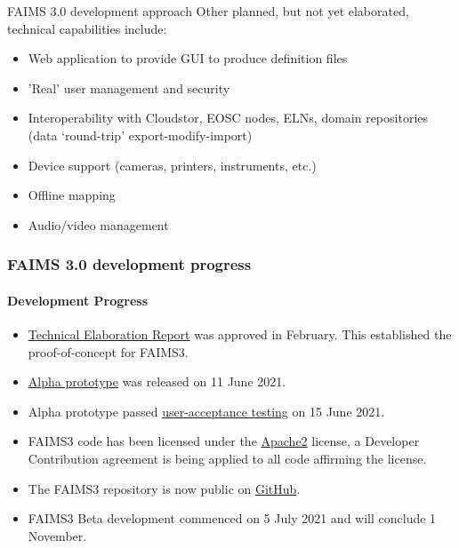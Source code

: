 \documentclass[aspectratio=169, 12pt]{beamer} %
\begin{document}
\begin{frame}{FAIMS 3.0 development approach}
Other planned, but not yet elaborated, technical capabilities include:
    \begin{itemize}[label=\textbullet]
        \item Web application to provide GUI to produce definition files
        \item 'Real' user management and security
        \item Interoperability with Cloudstor, EOSC nodes, ELNs, domain repositories (data `round-trip' export-modify-import)
        \item Device support (cameras, printers, instruments, etc.)
        \item Offline mapping
        \item Audio/video management
    \end{itemize}
\end{frame}

\begin{frame}
    \frametitle{FAIMS 3.0 development progress}
    \framesubtitle{Development Progress}        
        \begin{itemize}[label=\textbullet]
            \item \href{https://docs.google.com/document/d/13eTN8jhJa3Pgs9GOdo7r4jtIQcskNo7ikxJcBDBKHzw/edit}{Technical Elaboration Report} was approved in February. This established the proof-of-concept for FAIMS3. 
          \item \href{https://github.com/FAIMS/FAIMS3/releases/tag/v0.1.0-alpha}{Alpha prototype} was released on 11 June 2021.  
          \item Alpha prototype passed \href{https://doi.org/10.5281/zenodo.5030772}{user-acceptance testing} on 15 June 2021.
        \item FAIMS3 code has been licensed under the \href{https://www.apache.org/licenses/LICENSE-2.0}{Apache2} license, a Developer Contribution agreement is being applied to all code affirming the license. 
        \item The FAIMS3 repository is now public on \href{https://github.com/FAIMS/FAIMS3}{GitHub}.
        \item FAIMS3 Beta development commenced on 5 July 2021 and will conclude 1 November. 

    \end{itemize}



\end{frame} 
\end{document}
